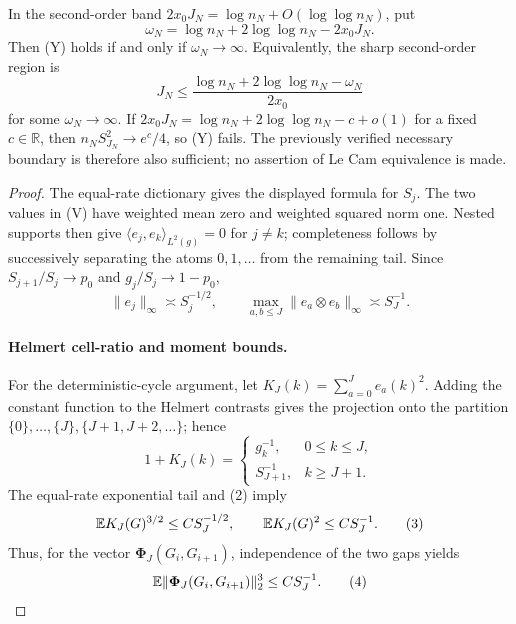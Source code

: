 \begin{proposition}
In the second-order band
$2x_0J_N=\log n_N+O(\log\log n_N)$, put
\[
 \omega_N=\log n_N+2\log\log n_N-2x_0J_N.
\]
Then \textup{(Y)} holds if and only if $\omega_N\to\infty$.  Equivalently,
the sharp second-order region is
\[
 J_N\leq
 \frac{\log n_N+2\log\log n_N-\omega_N}{2x_0}
 \tag{AC}
\]
for some $\omega_N\to\infty$.
If
$2x_0J_N=\log n_N+2\log\log n_N-c+o(1)$ for a fixed $c\in\mathbb R$, then
$n_NS_{J_N}^2\to e^c/4$, so \textup{(Y)} fails.  The previously verified
necessary boundary is therefore also sufficient; no assertion of Le Cam
equivalence is made.
\end{proposition}

\begin{proof}
The equal-rate dictionary gives the displayed formula for $S_j$.
The two values in \textup{(V)} have weighted mean zero and weighted squared
norm one.  Nested supports then give
$\langle e_j,e_k\rangle_{L^2(g)}=0$ for $j\neq k$; completeness follows by
successively separating the atoms $0,1,\ldots$ from the remaining tail.
Since $S_{j+1}/S_j\to p_0$ and $g_j/S_j\to1-p_0$,
\[
 \|e_j\|_\infty\asymp S_j^{-1/2},\qquad
 \max_{a,b\leq J}\|e_a\otimes e_b\|_\infty\asymp S_J^{-1}.
 \tag{1}
\]

\paragraph{Helmert cell-ratio and moment bounds.}
For the deterministic-cycle argument, let
$K_J(k)=\sum_{a=0}^Je_a(k)^2$.  Adding the constant function to the Helmert
contrasts gives the projection onto the partition
$\{0\},\ldots,\{J\},\{J+1,J+2,\ldots\}$; hence
\[
 1+K_J(k)=
 \begin{cases}
  g_k^{-1},&0\leq k\leq J,\\
  S_{J+1}^{-1},&k\geq J+1.
 \end{cases}
 \tag{2}
\]
The equal-rate exponential tail and \textup{(2)} imply
\[
 \mathbb E K_J(G)^{3/2}\leq C S_J^{-1/2},\qquad
 \mathbb E K_J(G)^2\leq C S_J^{-1}.
 \tag{3}
\]
Thus, for the vector $\boldsymbol\Phi_J(G_i,G_{i+1})$, independence of the
two gaps yields
\[
 \mathbb E\|\boldsymbol\Phi_J(G_i,G_{i+1})\|_2^3\leq C S_J^{-1}.
 \tag{4}
\]


\end{proof}
